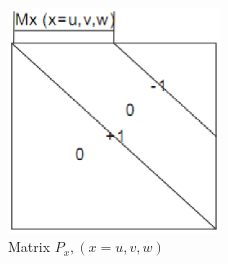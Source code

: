 \begin{figure}
\centering
\includegraphics[width=0.5\textwidth]{bilder/P_matrix}
\caption{Matrix $P_{x},(x=u,v,w)$}
\label{fig:Matrix Px}
\end{figure}

